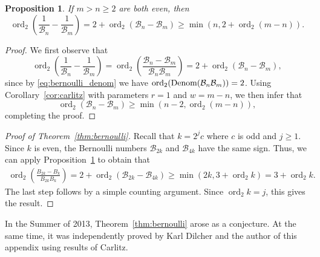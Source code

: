 \documentclass[12pt]{amsart}
\newcommand\Denom{\textup{Denom}}
\newcommand\BN{\mathcal{B}}             %
\DeclareMathOperator{\ord}{ord}
\newtheorem{Proposition}[Theorem]{Proposition}
\theoremstyle{remark}
\begin{document}
\begin{Proposition} \label{prop:bernoulli_ord2}
If $m>n \geq 2$ are both even, then
%
\[
  \ord_2 \left( \frac{1}{\BN_n} - \frac{1}{\BN_m} \right)
    = 2 + \ord_2 ( \BN_n - \BN_m )
    \geq \min ( n, 2 + \ord_2( m - n ) ).
\]
%
\end{Proposition}

\begin{proof}
We first observe that
%
\[
  \ord_2 \left( \frac{1}{\BN_n} - \frac{1}{\BN_m} \right)
    = \ord_2 \left( \frac{\BN_n - \BN_m}{\BN_n \BN_m} \right)
    = 2 + \ord_2 ( \BN_n - \BN_m ),
\]
%
since by \eqref{eq:bernoulli_denom} we have $\ord_2( \Denom(\BN_n \BN_m) ) = 2$.
Using Corollary~\ref{cor:carlitz} with parameters $r = 1$ and $w = m - n$,
we then infer that
%
\[
  \ord_2 ( \BN_n - \BN_m ) \geq \min ( n{-}2, \ord_2( m - n ) ),
\]
%
completing the proof.
%
\end{proof}

\begin{proof}[Proof of Theorem~\ref{thm:bernoulli}]
Recall that $k = 2^j c$ where $c$ is odd and $j \geq 1$.
Since $k$ is even, the Bernoulli numbers $\BN_{2k}$ and $\BN_{4k}$
have the same sign.
Thus, we can apply Proposition~\ref{prop:bernoulli_ord2} to obtain that
%
\begin{align*}
  \ord_2 \left( \frac{B_{2k} - B_k}{B_{2k}B_k} \right)
    = 2 + \ord_2 ( \BN_{2k} - \BN_{4k} )
    \geq \min ( 2k, 3 + \ord_2 k ) = 3 + \ord_2 k.
\end{align*}
%
The last step follows by a simple counting argument.
Since $\ord_2 k = j$, this gives the result.
%
\end{proof}

In the Summer of 2013, Theorem~\ref{thm:bernoulli} arose as a conjecture.
At the same time, it was independently proved by Karl Dilcher and
the author of this appendix using results of Carlitz.

\end{document}
